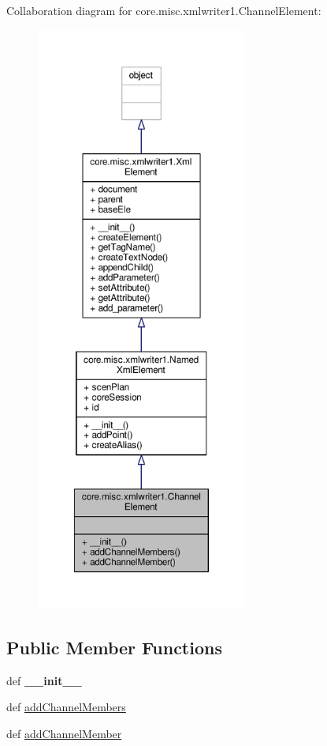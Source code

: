 Collaboration diagram for core.\+misc.\+xmlwriter1.\+Channel\+Element\+:
\nopagebreak
\begin{figure}[H]
\begin{center}
\leavevmode
\includegraphics[height=550pt]{classcore_1_1misc_1_1xmlwriter1_1_1_channel_element__coll__graph}
\end{center}
\end{figure}
\subsection*{Public Member Functions}
\begin{DoxyCompactItemize}
\item 
\hypertarget{classcore_1_1misc_1_1xmlwriter1_1_1_channel_element_ad19c4403b3946420016504a52a6ce8ae}{def {\bfseries \+\_\+\+\_\+init\+\_\+\+\_\+}}\label{classcore_1_1misc_1_1xmlwriter1_1_1_channel_element_ad19c4403b3946420016504a52a6ce8ae}

\item 
def \hyperlink{classcore_1_1misc_1_1xmlwriter1_1_1_channel_element_a95eb20b81612b88d71acf5dd3085fdac}{add\+Channel\+Members}
\item 
def \hyperlink{classcore_1_1misc_1_1xmlwriter1_1_1_channel_element_a31222b4e6cfcbaa15360b294441435ef}{add\+Channel\+Member}
\end{DoxyCompactItemize}
